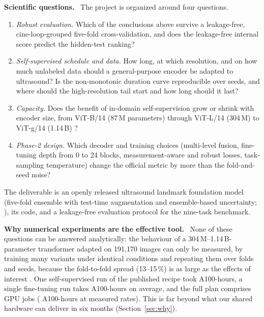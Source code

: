 \documentclass[11pt,a4paper]{article}
\newcommand{\para}[1]{\textbf{#1}\ }
\begin{document}
\para{Scientific questions.} The project is organized around four questions.
\begin{enumerate}[label=\textbf{(Q\arabic*)},leftmargin=2.6em]
\item \emph{Robust evaluation.} Which of the conclusions above survive a leakage-free, cine-loop-grouped five-fold cross-validation, and does the leakage-free internal score predict the hidden-test ranking?
\item \emph{Self-supervised schedule and data.} How long, at which resolution, and on how much unlabeled data should a general-purpose encoder be adapted to ultrasound? Is the non-monotonic duration curve reproducible over seeds, and where should the high-resolution tail start and how long should it last?
\item \emph{Capacity.} Does the benefit of in-domain self-supervision grow or shrink with encoder size, from ViT-B/14 (87\,M parameters) through ViT-L/14 (304\,M) to ViT-g/14 (1.14\,B) \citep{dosovitskiy2021image,zhai2022scaling}?
\item \emph{Phase-2 design.} Which decoder and training choices (multi-level fusion, fine-tuning depth from 0 to 24 blocks, measurement-aware and robust losses, task-sampling temperature) change the official metric by more than the fold-and-seed noise?
\end{enumerate}
The deliverable is an openly released ultrasound landmark foundation model (five-fold ensemble with test-time augmentation and ensemble-based uncertainty; \citealp{lakshminarayanan2017ensembles}), its code, and a leakage-free evaluation protocol for the nine-task benchmark.

\para{Why numerical experiments are the effective tool.} None of these questions can be answered analytically: the behaviour of a 304\,M--1.14\,B-parameter transformer adapted on 191,170 images can only be measured, by training many variants under identical conditions and repeating them over folds and seeds, because the fold-to-fold spread (13--15\,\%) is as large as the effects of interest \citep{bouthillier2021variance}. One self-supervised run of the published recipe took \PaperRecipeH{} A100-hours, a single fine-tuning run takes \PtwoRunH{} A100-hours on average, and the full plan comprises \NRuns{} GPU jobs (\GPUhMeasured{} A100-hours at measured rates). This is far beyond what our shared hardware can deliver in six months (Section~\ref{sec:why}).

\end{document}
